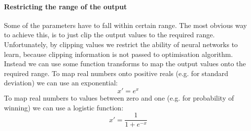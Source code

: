 \documentclass[12pt,a4paper]{book}
\begin{document}
\paragraph{Restricting the range of the output}
Some of the parameters have to fall within certain range.
The most obvious way to achieve this, is to just clip the output values to the required range.
Unfortunately, by clipping values we restrict the ability of neural networks to learn, because clipping information is not passed to optimisation algorithm.
Instead we can use some function transforms to map the output values onto the required range.
To map real numbers onto positive reals (e.g. for standard deviation) we can use an exponential:
\begin{equation}
x' = e^x
\end{equation}
To map real numbers to values between zero and one (e.g. for probability of winning) we can use a logistic function:
\begin{equation}
x' = \frac{1}{1+e^{-x}}
\end{equation}
\end{document}
